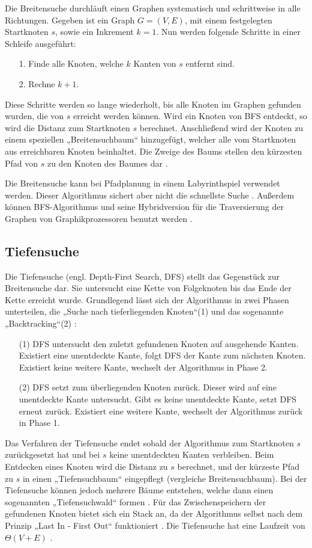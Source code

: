 Die Breitensuche durchläuft einen Graphen systematisch und schrittweise in alle Richtungen. Gegeben ist ein Graph $G = (V, E)$, mit einem festgelegten Startknoten $s$, sowie ein Inkrement $k=1$. Nun werden folgende Schritte in einer Schleife ausgeführt:
\begin{itemize}
\item[1.] Finde alle Knoten, welche $k$ Kanten von $s$ entfernt sind.
\item[2.] Rechne $k + 1$.
\end{itemize}
Diese Schritte werden so lange wiederholt, bis alle Knoten im Graphen gefunden wurden, die von $s$ erreicht werden können. Wird ein Knoten von BFS entdeckt, so wird die Distanz zum Startknoten $s$ berechnet. Anschließend wird der Knoten zu einem speziellen „Breitensuchbaum“ hinzugefügt, welcher alle vom Startknoten aus erreichbaren Knoten beinhaltet. Die Zweige des Baums stellen den kürzesten Pfad von $s$ zu den Knoten des Baumes dar \cite[S.594]{Cormen.2009}.

Die Breitensuche kann bei Pfadplanung in einem Labyrinthspiel verwendet werden. Dieser Algorithmus sichert aber nicht die schnellste Suche \cite{PBAS18}. Außerdem können BFS-Algorithmus und seine Hybridversion \cite{HT13} für die Traversierung der Graphen von Graphikprozessoren benutzt werden \cite{MGG12}.

\subsection{Tiefensuche}

Die Tiefensuche (engl. Depth-First Search, DFS) stellt das Gegenstück zur Breitensuche dar. Sie untersucht eine Kette von Folgeknoten bis das Ende der Kette erreicht wurde. Grundlegend lässt sich der Algorithmus in zwei Phasen unterteilen, die „Suche nach tieferliegenden Knoten“(1) und das sogenannte „Backtracking“(2) \cite{Tarjan.1972}:
\begin{itemize}
	\item[(1)] DFS untersucht den zuletzt gefundenen Knoten auf ausgehende Kanten. Existiert eine unentdeckte Kante, folgt DFS der Kante zum nächsten Knoten. Existiert keine weitere Kante, wechselt der Algorithmus in Phase 2.
	\item[(2)] DFS setzt zum überliegenden Knoten zurück. Dieser wird auf eine unentdeckte Kante untersucht. Gibt es keine unentdeckte Kante, setzt DFS erneut zurück. Existiert eine weitere Kante, wechselt der Algorithmus zurück in Phase 1.	
\end{itemize}
Das Verfahren der Tiefensuche endet sobald der Algorithmus zum Startknoten $s$ zurückgesetzt hat und bei $s$ keine unentdeckten Kanten verbleiben. Beim Entdecken eines Knoten wird die Distanz zu $s$ berechnet, und der kürzeste Pfad zu $s$ in einen „Tiefensuchbaum“ eingepflegt (vergleiche Breitensuchbaum). Bei der Tiefensuche können jedoch mehrere Bäume entstehen, welche dann einen sogenannten „Tiefensuchwald“ formen \cite[S.603]{Cormen.2009}.
Für das Zwischenspeichern der gefundenen Knoten bietet sich ein Stack an, da der Algorithmus selbst nach dem Prinzip „Last In - First Out“ funktioniert \cite{Tarjan.1972}. Die Tiefensuche hat eine Laufzeit von $\Theta(V + E)$ \cite[S.606]{Cormen.2009}.

